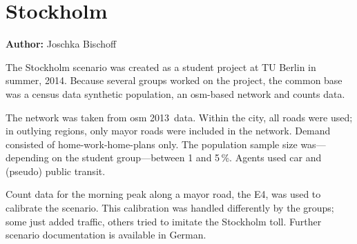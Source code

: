 \chapter{Stockholm}
\label{ch:stockholm}
\hfill \textbf{Author:} Joschka Bischoff


The Stockholm scenario was created as a student project at TU Berlin in summer, 2014. 
Because several groups worked on the project, the common base was a census data synthetic population, an \gls{osm}-based network and counts data.

The network was taken from \gls{osm} 2013~data. 
Within the city, all roads were used; in outlying regions, only mayor roads were included in the network. 
Demand consisted of home-work-home-plans only. 
The population sample size was---depending on the student group---between 1 and 5\,\%. Agents used car and (pseudo) public transit.

Count data for the morning peak along a mayor road, the E4, was used to calibrate the scenario. 
This calibration was handled differently by the groups; some just added traffic, others tried to imitate the Stockholm toll. 
Further scenario documentation is available in German. 

